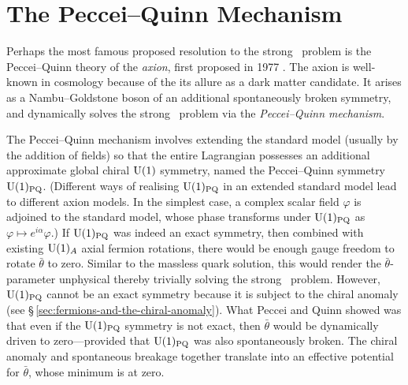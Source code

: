 



\section{The Peccei--Quinn Mechanism}


Perhaps the most famous proposed resolution to the strong \CP\ problem is the Peccei--Quinn theory of the \emph{axion}, first proposed in 1977 \cite{PecceiQuinn_1977}.
The axion is well-known in cosmology because of the its allure as a dark matter candidate.
It arises as a Nambu--Goldstone boson of an additional spontaneously broken symmetry, and dynamically solves the strong \CP\ problem via the \emph{Peccei--Quinn mechanism}.

The Peccei--Quinn mechanism involves extending the standard model (usually by the addition of fields) so that the entire Lagrangian possesses an additional approximate global chiral $\mathrm{U}(1)$ symmetry, named the Peccei--Quinn symmetry $\mathrm{U}(1)_\text{PQ}$.
(Different ways of realising $\mathrm{U}(1)_\text{PQ}$ in an extended standard model lead to different axion models.
In the simplest case, a complex scalar field $φ$ is adjoined to the standard model, whose phase transforms under $\mathrm{U}(1)_\text{PQ}$ as $φ \mapsto e^{iα}φ$.)
If $\mathrm{U}(1)_\text{PQ}$ was indeed an exact symmetry, then combined with existing $\mathrm{U}(1)_A$ axial fermion rotations, there would be enough gauge freedom to rotate $\bar θ$ to zero.
Similar to the massless quark solution, this would render the $\bar θ$-parameter unphysical thereby trivially solving the strong \CP\ problem.
However, $\mathrm{U}(1)_\text{PQ}$ cannot be an exact symmetry because it is subject to the chiral anomaly (see §\,\ref{sec:fermions-and-the-chiral-anomaly}).
What Peccei and Quinn showed was that even if the $\mathrm{U}(1)_\text{PQ}$ symmetry is not exact, then $\bar θ$ would be dynamically driven to zero---provided that $\mathrm{U}(1)_\text{PQ}$ was also spontaneously broken.
The chiral anomaly and spontaneous breakage together translate into an effective potential for $\bar θ$, whose minimum is at zero.


